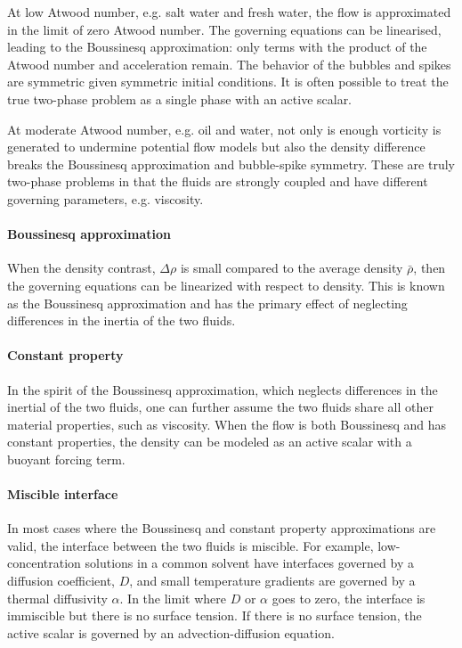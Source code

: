 At low Atwood number, e.g. salt water and fresh water, the flow is approximated in the limit of zero Atwood number.
The governing equations can be linearised, leading to the Boussinesq approximation: only terms with the product of the Atwood number and acceleration remain.
The behavior of the bubbles and spikes are symmetric given symmetric initial conditions.
It is often possible to treat the true two-phase problem as a single phase with an active scalar.

At moderate Atwood number, e.g. oil and water, not only is enough vorticity is generated to undermine potential flow models but also the density difference breaks the Boussinesq approximation and bubble-spike symmetry.
These are truly two-phase problems in that the fluids are strongly coupled and have different governing parameters, e.g. viscosity.

\paragraph{Boussinesq approximation}
When the density contrast, $\Delta \rho$ is small compared to the average density $\bar{\rho}$, then 
the governing equations can be linearized with respect to density.
This is known as the Boussinesq approximation and has the primary effect of neglecting differences in the inertia of the two fluids.

\paragraph{Constant property}
In the spirit of the Boussinesq approximation, which neglects differences in the inertial of the two fluids, one can further assume the two fluids share all other material properties, such as viscosity.
When the flow is both Boussinesq and has constant properties, the density can be modeled as an active scalar with a buoyant forcing term.

\paragraph{Miscible interface}
In most cases where the Boussinesq and constant property approximations are valid, the interface between the two fluids is miscible.
For example, low-concentration solutions in a common solvent have interfaces governed by a diffusion coefficient, $D$, and small temperature gradients are governed by a thermal diffusivity $\alpha$.
In the limit where $D$ or $\alpha$ goes to zero, the interface is immiscible but there is no surface tension.
If there is no surface tension, the active scalar is governed by an advection-diffusion equation.


